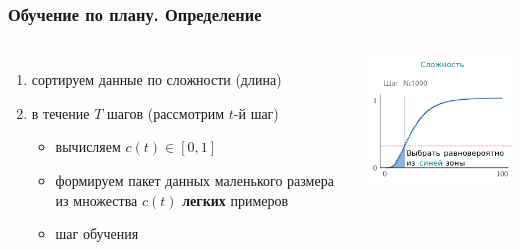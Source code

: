 \documentclass{beamer}
\begin{document}
\begin{frame}
	\frametitle{Обучение по плану. Определение}
	\begin{columns}
		\begin{enumerate}
			\item сортируем данные по сложности (длина)
			\item в течение $T$ шагов (рассмотрим $t$-й шаг)
			\begin{itemize}
				\item вычисляем $c(t) \in [0, 1]$
				\item формируем пакет данных маленького размера из множества $c(t)$ {\bf легких} примеров
				\item шаг обучения
			\end{itemize}
		\end{enumerate}
		\includegraphics[scale=0.8]{acl19_algo.png}
	\end{columns}
	\let\thefootnote\relax{}
\end{frame}
\end{document}
